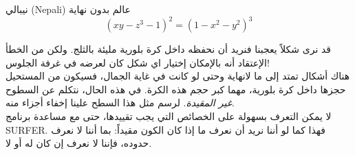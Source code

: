 \begin{surferPage}[نيبالي]{نيبالي (Nepali)}
عالم بدون نهاية \\

\smallskip
\[(x y - z^3 -1)^2= (1 - x^2 - y^2)^3\]

\singlespacing
قد نرى شكلاً يعجبنا فنريد أن نحفظه داخل كرة بلورية مليئة بالثلج. ولكن من الخطأ الإعتقاد أنه بالإمكان إختيار اي شكل كان لعرضه في غرفة الجلوس!
\\
\singlespacing
هناك أشكال تمتد إلى ما لانهاية وحتى لو كانت في غاية الجمال، فسيكون من المستحيل حجزها داخل كرة بلورية، مهما كبر حجم هذه الكرة. في هذه الحال، نتكلم عن السطوح \textit{غير المقيدة}. لرسم مثل هذا السطح علينا إخفاء أجزاء منه.
\\
\singlespacing
لا يمكن التعرف بسهولة على الخصائص التي يجب تقييدها، حتى مع مساعدة برنامج \textenglish{SURFER}. فهذا كما لو أننا نريد أن نعرف ما إذا كان الكون مقيداً: بما أننا لا نعرف حدوده، فإننا لا نعرف إن كان له أو لا.
\end{surferPage}
